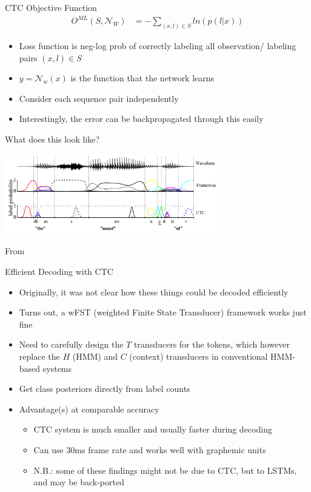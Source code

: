 \begin{frame}{CTC Objective Function}
  \begin{align}
    O^{ML}(S,\mathcal{N}_W)&=-\sum_{(x,l) \in S} ln(p(l|x))
  \end{align}
  \begin{itemize}
  \item Loss function is neg-log prob of correctly labeling all observation/ labeling pairs $(x,l) \in S$
  \item $y = \mathcal{N}_w (x)$ is the function that the network learns
  \item Consider each sequence pair independently
  \item Interestingly, the error can be backpropagated through this easily
  \end{itemize}
\end{frame}

\begin{frame}{What does this look like?}
  \begin{center}
    \includegraphics[height=35mm]{figures/ctc}
  \end{center}
  \tiny From \cite{graves2006connectionist}
\end{frame}

\begin{frame}{Efficient Decoding with CTC}
  \begin{itemize}
  \item Originally, it was not clear how these things could be decoded efficiently
  \item Turns out, a wFST (weighted Finite State Transducer) framework works just fine \cite{eesen,sak2015fast}
  \item Need to carefully design the $T$ transducers for the tokens, which however replace the $H$ (HMM) and $C$ (context) transducers in conventional HMM-based systems
  \item Get class posteriors directly from label counts
  \item Advantage(s) at comparable accuracy
    \begin{itemize}
    \item CTC system is much smaller and usually faster during decoding
    \item Can use 30ms frame rate and works well with graphemic units
    \item N.B.: some of these findings might not be due to CTC, but to LSTMs, and may be back-ported
    \end{itemize}
  \end{itemize}
\end{frame}

